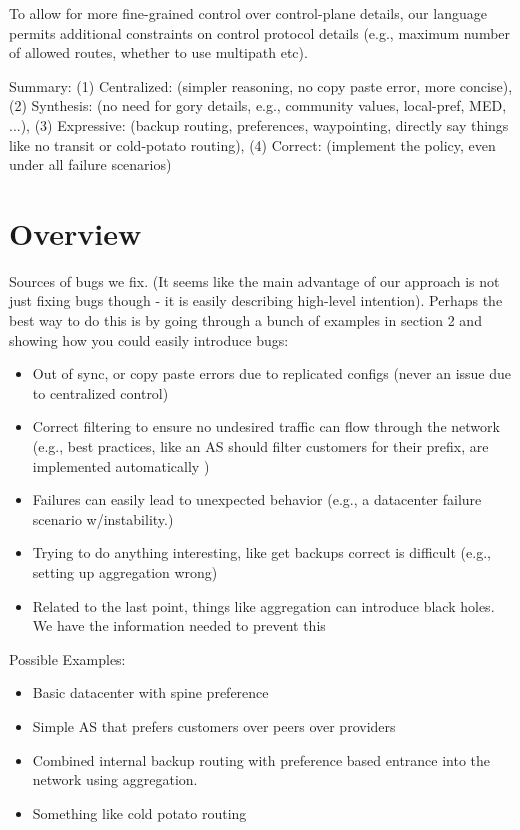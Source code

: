 \documentclass{paper}
\begin{document}
To allow for more fine-grained control over control-plane details, our language permits additional constraints on control protocol details (e.g., maximum number of allowed routes, whether to use multipath etc).


Summary: 
	 (1) Centralized: (simpler reasoning, no copy paste error, more concise), 
	 (2) Synthesis: (no need for gory details, e.g., community values, local-pref, MED, ...),
	 (3) Expressive: (backup routing, preferences, waypointing, directly say things like no transit or cold-potato routing), 
	 (4) Correct: (implement the policy, even under all failure scenarios)


\section{Overview}

Sources of bugs we fix. (It seems like the main advantage of our approach is not just fixing bugs though - it is easily describing high-level intention). 
Perhaps the best way to do this is by going through a bunch of examples in section 2 and showing how you could easily introduce bugs:

\begin{itemize}
	\item Out of sync, or copy paste errors due to replicated configs (never an issue due to centralized control)
	\item Correct filtering to ensure no undesired traffic can flow through the network (e.g., best practices, like an AS should filter customers for their prefix, are implemented automatically )
	\item Failures can easily lead to unexpected behavior (e.g., a datacenter failure scenario w/instability.)
	\item Trying to do anything interesting, like get backups correct is difficult (e.g., setting up aggregation wrong)
	\item Related to the last point, things like aggregation can introduce black holes. We have the information needed to prevent this
\end{itemize}


Possible Examples:
\begin{itemize}
	\item Basic datacenter with spine preference
	\item Simple AS that prefers customers over peers over providers
	\item Combined internal backup routing with preference based entrance into the network using aggregation.
	\item Something like cold potato routing
\end{itemize}
\end{document}
